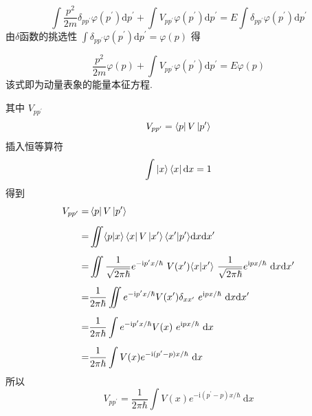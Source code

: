 \documentclass[12pt, a4paper, oneside, UTF8]{ctexbook}
\begin{document}
\begin{equation}
    \int \frac{p^2}{2m} \delta_{pp^{\prime}} \varphi(p^{\prime}) \mathrm{d}p^{\prime} + \int V_{pp^{\prime}} \varphi(p^{\prime})\mathrm{d}p^{\prime} = E \int \delta_{pp^{\prime}} \varphi(p^{\prime})\mathrm{d}p^{\prime}
\end{equation}
由$\delta$函数的挑选性 $\int \delta_{pp^{\prime}} \varphi(p^{\prime})\mathrm{d}p^{\prime} = \varphi(p)$ 得

\begin{equation}
    \boxed{
    \frac{p^2}{2m}\varphi(p) + \int V_{pp^{\prime}} \varphi(p^{\prime})\mathrm{d}p^{\prime} = E \varphi(p)
    }
\end{equation} 
该式即为动量表象的能量本征方程.

其中 $V_{pp^{\prime}}$ 
\begin{equation}
        V_{pp^{\prime}} = \bra{p}V\ket{p^{\prime}}
\end{equation}
插入恒等算符
\begin{equation}
    \int\ket{x}\bra{x}\mathrm{d}x = 1 
\end{equation}
得到
\begin{equation}
    \begin{aligned}
        V_{pp^{\prime}}  =& \bra{p}V\ket{p^{\prime}} \\[5pt]
        =& \iint \langle p|x \rangle \bra{x} V \ket{x^{\prime}} \langle x^{\prime}|p^{\prime}\rangle \mathrm{d}x\mathrm{d}x^{\prime}\\[5pt]
        =& \iint \frac{1}{\sqrt{2\pi\hbar}}e^{-\mathrm{i}p^{\prime}x/\hbar} \ V(x^{\prime})\langle x|x^{\prime}\rangle \ \frac{1}{\sqrt{2\pi\hbar}}e^{\mathrm{i}px/\hbar}\ \mathrm{d}x\mathrm{d}x^{\prime}\\[5pt]
        =& \frac{1}{2\pi\hbar} \iint e^{-\mathrm{i}p^{\prime}x/\hbar} V(x^{\prime}) \delta_{xx^{\prime}}\ e^{\mathrm{i}px/\hbar} \ \mathrm{d}x\mathrm{d}x^{\prime}\\[5pt]
        =& \frac{1}{2\pi\hbar} \int e^{-\mathrm{i}p^{\prime}x/\hbar} V(x) \ e^{\mathrm{i}px/\hbar} \ \mathrm{d}x \\[5pt]
        =& \frac{1}{2\pi\hbar} \int V(x) e^{-\mathrm{i}(p^{\prime}-p)x/\hbar}\ \mathrm{d}x \\
    \end{aligned}
\end{equation}
所以
\begin{equation}
    \boxed{
        V_{pp^{\prime}}= \frac{1}{2\pi\hbar} \int V(x) e^{-\mathrm{i}(p^{\prime}-p)x/\hbar}\ \mathrm{d}x
    }
\end{equation}

\ifx\allfiles\undefined
\end{document}
